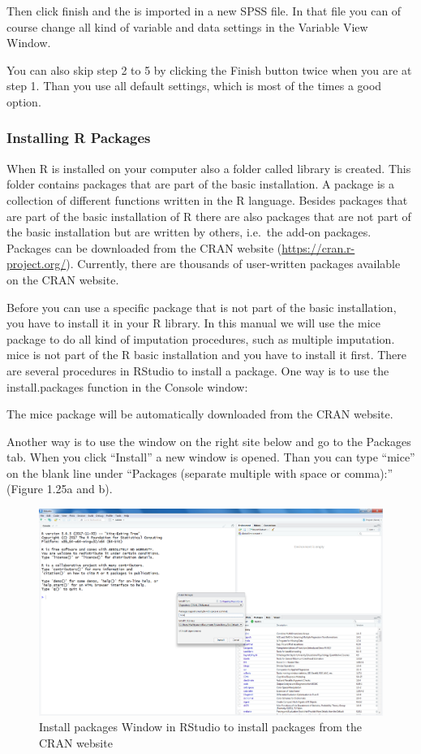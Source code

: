 \documentclass[]{book}
\theoremstyle{definition}
\theoremstyle{definition}
\theoremstyle{definition}
\theoremstyle{remark}
\begin{document}
Then click finish and the is imported in a new SPSS file. In that file
you can of course change all kind of variable and data settings in the
Variable View Window.

You can also skip step 2 to 5 by clicking the Finish button twice when
you are at step 1. Than you use all default settings, which is most of
the times a good option.

\subsubsection{Installing R Packages}\label{installing-r-packages}

When R is installed on your computer also a folder called library is
created. This folder contains packages that are part of the basic
installation. A package is a collection of different functions written
in the R language. Besides packages that are part of the basic
installation of R there are also packages that are not part of the basic
installation but are written by others, i.e.~the add-on packages.
Packages can be downloaded from the CRAN website
(\url{https://cran.r-project.org/}). Currently, there are thousands of
user-written packages available on the CRAN website.

Before you can use a specific package that is not part of the basic
installation, you have to install it in your R library. In this manual
we will use the mice package to do all kind of imputation procedures,
such as multiple imputation. mice is not part of the R basic
installation and you have to install it first. There are several
procedures in RStudio to install a package. One way is to use the
install.packages function in the Console window:

The mice package will be automatically downloaded from the CRAN website.

Another way is to use the window on the right site below and go to the
Packages tab. When you click ``Install'' a new window is opened. Than
you can type ``mice'' on the blank line under ``Packages (separate
multiple with space or comma):'' (Figure 1.25a and b).

\begin{figure}

{\centering \includegraphics[width=0.8\linewidth]{images/fig1.25a} 

}

\caption{Install packages Window in RStudio to install packages from the CRAN website}\label{fig:fig25}
\end{figure}
\end{document}
